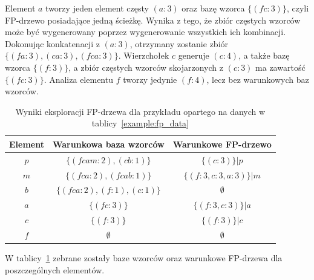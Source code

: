 Element $a$ tworzy jeden element częsty $(a:3)$ oraz bazę wzorca $\lbrace (fc:3) \rbrace$, czyli FP-drzewo posiadające jedną ścieżkę. Wynika z tego, że zbiór częstych wzorców może być wygenerowany poprzez wygenerowanie wszystkich ich kombinacji. Dokonując konkatenacji z $(a:3)$, otrzymany zostanie zbiór $\lbrace (fa:3), (ca:3), (fca:3) \rbrace$. Wierzchołek $c$ generuje $(c:4)$, a także bazę wzorca $\lbrace (f:3) \rbrace$, a zbiór częstych wzorców skojarzonych z $(c:3)$ ma zawartość $\lbrace (fc:3)\rbrace$. Analiza elementu $f$ tworzy jedynie $(f:4)$, lecz bez warunkowych baz wzorców.

\begin{table}
	\centering
	\begin{tabular}{c|c|c}
	\textbf{Element} &  \textbf{Warunkowa baza wzorców} & \textbf{Warunkowe FP-drzewo} \\ \hline
	$p$ & $\lbrace ( fcam: 2 ), (cb: 1) \rbrace$ & $\lbrace (c:3) \rbrace | p$ \\ 
	$m$ & $\lbrace ( fca: 2 ), (fcab: 1) \rbrace$ & $\lbrace (f:3, c:3, a:3) \rbrace | m$ \\ 
	$b$ & $\lbrace ( fca: 2 ), (f: 1), (c: 1) \rbrace$ & $\emptyset$ \\ 
	$a$ & $\lbrace ( fc: 3 ) \rbrace$ & $\lbrace (f:3, c:3) \rbrace | a$ \\ 
	$c$ & $\lbrace ( f: 3 ) \rbrace$ & $\lbrace (f:3) \rbrace | c$ \\ 
	$f$ & $\emptyset$ & $\emptyset$ \\ 
	\end{tabular}
	\caption{Wyniki eksploracji FP-drzewa dla przykładu opartego na danych w tablicy~\ref{example:fp_data}\label{example:sum_patterns}}
\end{table}

W tablicy~\ref{example:sum_patterns} zebrane zostały baze wzorców oraz warunkowe FP-drzewa dla poszczególnych elementów.